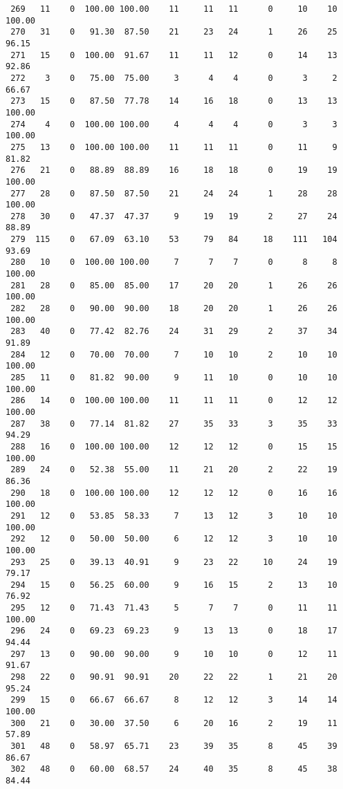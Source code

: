 \begin{verbatim}
 269   11    0  100.00 100.00    11     11   11      0     10    10   100.00
 270   31    0   91.30  87.50    21     23   24      1     26    25    96.15
 271   15    0  100.00  91.67    11     11   12      0     14    13    92.86
 272    3    0   75.00  75.00     3      4    4      0      3     2    66.67
 273   15    0   87.50  77.78    14     16   18      0     13    13   100.00
 274    4    0  100.00 100.00     4      4    4      0      3     3   100.00
 275   13    0  100.00 100.00    11     11   11      0     11     9    81.82
 276   21    0   88.89  88.89    16     18   18      0     19    19   100.00
 277   28    0   87.50  87.50    21     24   24      1     28    28   100.00
 278   30    0   47.37  47.37     9     19   19      2     27    24    88.89
 279  115    0   67.09  63.10    53     79   84     18    111   104    93.69
 280   10    0  100.00 100.00     7      7    7      0      8     8   100.00
 281   28    0   85.00  85.00    17     20   20      1     26    26   100.00
 282   28    0   90.00  90.00    18     20   20      1     26    26   100.00
 283   40    0   77.42  82.76    24     31   29      2     37    34    91.89
 284   12    0   70.00  70.00     7     10   10      2     10    10   100.00
 285   11    0   81.82  90.00     9     11   10      0     10    10   100.00
 286   14    0  100.00 100.00    11     11   11      0     12    12   100.00
 287   38    0   77.14  81.82    27     35   33      3     35    33    94.29
 288   16    0  100.00 100.00    12     12   12      0     15    15   100.00
 289   24    0   52.38  55.00    11     21   20      2     22    19    86.36
 290   18    0  100.00 100.00    12     12   12      0     16    16   100.00
 291   12    0   53.85  58.33     7     13   12      3     10    10   100.00
 292   12    0   50.00  50.00     6     12   12      3     10    10   100.00
 293   25    0   39.13  40.91     9     23   22     10     24    19    79.17
 294   15    0   56.25  60.00     9     16   15      2     13    10    76.92
 295   12    0   71.43  71.43     5      7    7      0     11    11   100.00
 296   24    0   69.23  69.23     9     13   13      0     18    17    94.44
 297   13    0   90.00  90.00     9     10   10      0     12    11    91.67
 298   22    0   90.91  90.91    20     22   22      1     21    20    95.24
 299   15    0   66.67  66.67     8     12   12      3     14    14   100.00
 300   21    0   30.00  37.50     6     20   16      2     19    11    57.89
 301   48    0   58.97  65.71    23     39   35      8     45    39    86.67
 302   48    0   60.00  68.57    24     40   35      8     45    38    84.44

\end{verbatim}
